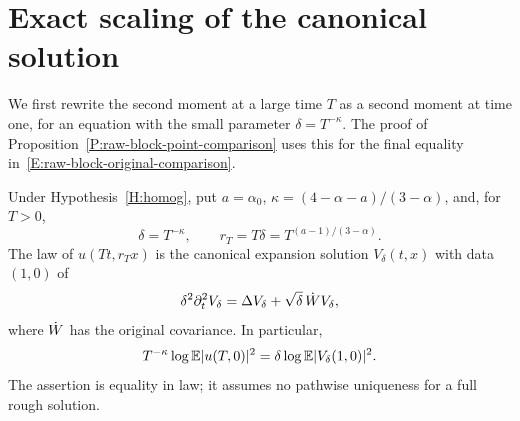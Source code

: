 \section{Exact scaling of the canonical solution}
\label{S:exact-canonical-scaling}

We first rewrite the second moment at a large time $T$ as a second moment at
time one, for an equation with the small parameter $\delta = T^{-\kappa}$. The
proof of Proposition~\ref{P:raw-block-point-comparison} uses this for the final
equality in~\eqref{E:raw-block-original-comparison}.

\begin{lemma}\label{L:exact-canonical-scaling}
  Under Hypothesis~\ref{H:homog}, put $a = \alpha_0$, $\kappa =
  (4-\alpha-a)/(3-\alpha)$, and, for $T > 0$,
  \[
    \delta=T^{-\kappa},\qquad
    r_T=T\delta=T^{(a-1)/(3-\alpha)}.
  \]
  The law of $u(Tt,r_Tx)$ is the canonical expansion solution $V_\delta(t,x)$
  with data $(1,0)$ of
  \begin{equation}\label{E:exact-fast-equation}
    \delta^2\partial_t^2V_\delta
    =\Delta V_\delta+\sqrt\delta\,\dot W V_\delta,
  \end{equation}
  where $\dot W$ has the original covariance. In particular,
  \begin{equation}\label{E:exact-moment-scaling}
    T^{-\kappa}\log\mathbb{E}|u(T,0)|^2
    =\delta\log\mathbb{E}|V_\delta(1,0)|^2.
  \end{equation}
  The assertion is equality in law; it assumes no pathwise uniqueness for a full
  rough solution.
\end{lemma}

